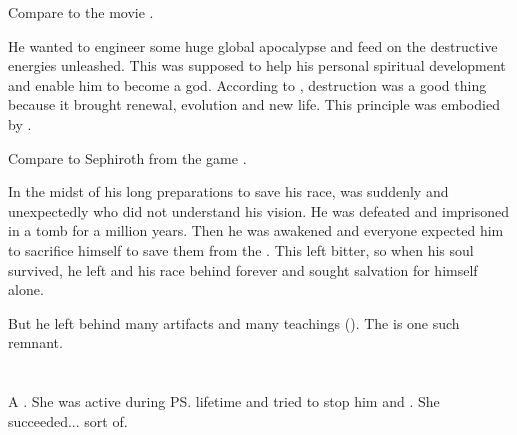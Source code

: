 Compare to the movie \cite{Movie:Watchmen}. 

He wanted to engineer some huge global apocalypse and feed on the destructive energies unleashed. 
This was supposed to help his personal spiritual development and enable him to become a god. 
According to , destruction was a good thing because it brought renewal, evolution and new life. 
This principle was embodied by .

Compare \Sethicus to Sephiroth from the game \cite{VideoGame:FinalFantasyVII}.


In the midst of his long preparations to save his race, \Sethicus was suddenly and unexpectedly  who did not understand his vision.
He was defeated and imprisoned in a tomb for a million years.
Then he was awakened and everyone expected him to sacrifice himself to save them from the \banes. 
This left \Sethicus bitter, so when his soul survived, he left \Miith and his race behind forever and sought salvation for himself alone. 

But he left behind many artifacts and many teachings (). 
The  is one such remnant. 















\section{\Vexstrasshin}
\index{\Vexstrasshin}
A \dragon{}. 
She was active during \ps{\Semiza} lifetime and tried to stop him and \Thanatzil. 
She succeeded... sort of. 

